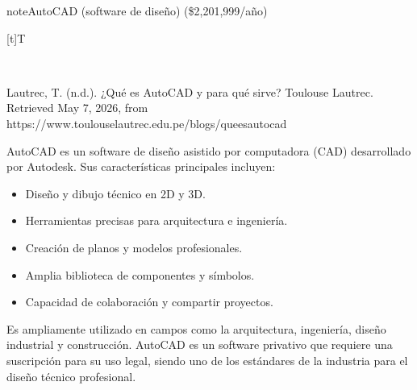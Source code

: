 \documentclass[letterpaper,10pt,spanish]{sphinxmanual}
\let\sphinxpxdimen\pdfpxdimen\else\newdimen\sphinxpxdimen
\begin{document}
\begin{sphinxadmonition}{note}{AutoCAD (software de diseño) (\$2,201,999/año)}


\begin{savenotes}\sphinxattablestart
\sphinxthistablewithglobalstyle
\centering
\begin{tabulary}{\linewidth}[t]{T}
\sphinxtoprule
\sphinxtableatstartofbodyhook

\begin{sphinxfigure-in-table}
\centering
\capstart
\noindent\sphinxincludegraphics[width=360\sphinxpxdimen]{{image121}.png}
\label{\detokenize{1_guias/10ofimatica/G1012:id52}}\end{sphinxfigure-in-table}\relax
\\
\sphinxbottomrule
\end{tabulary}
\sphinxtableafterendhook\par
\sphinxattableend\end{savenotes}

\sphinxAtStartPar
%
\begin{footnote}[14]\sphinxAtStartFootnote
Lautrec, T. (n.d.). ¿Qué es AutoCAD y para qué sirve? Toulouse Lautrec. Retrieved May 7, 2026, from https://www.toulouselautrec.edu.pe/blogs/que\sphinxhyphen{}es\sphinxhyphen{}autocad
%
\end{footnote} AutoCAD es un software de diseño asistido por computadora (CAD) desarrollado por Autodesk. Sus características principales incluyen:
\begin{itemize}
\item {} 
\sphinxAtStartPar
Diseño y dibujo técnico en 2D y 3D.

\item {} 
\sphinxAtStartPar
Herramientas precisas para arquitectura e ingeniería.

\item {} 
\sphinxAtStartPar
Creación de planos y modelos profesionales.

\item {} 
\sphinxAtStartPar
Amplia biblioteca de componentes y símbolos.

\item {} 
\sphinxAtStartPar
Capacidad de colaboración y compartir proyectos.

\end{itemize}

\sphinxAtStartPar
Es ampliamente utilizado en campos como la arquitectura, ingeniería, diseño industrial y construcción. AutoCAD es un software privativo que requiere una suscripción para su uso legal, siendo uno de los estándares de la industria para el diseño técnico profesional.
\end{sphinxadmonition}
\end{document}
